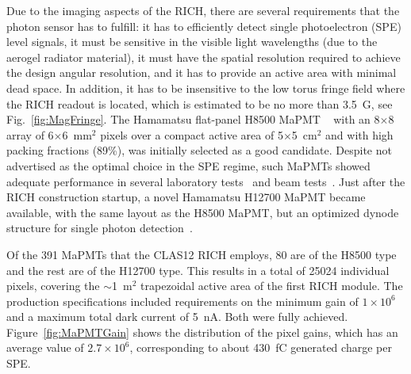 \documentclass[5p,times,twocolumn]{elsarticle}
\def\MaPMT{MaPMT }
\begin{document}
Due to the imaging aspects of the RICH, there are several requirements that the photon sensor has to fulfill: it has
to efficiently detect single photoelectron (SPE) level signals, it must be sensitive in the visible light wavelengths (due
to the aerogel radiator material), it must have the spatial resolution required to achieve the design angular resolution,
and it has to provide an active area with minimal dead space. In addition, it has to be insensitive to the low torus fringe
field where the RICH readout is located, which is estimated to be no more than 3.5~G, see Fig.~\ref{fig:MagFringe}.
The Hamamatsu flat-panel H8500 \MaPMT~\cite{Ref:H8500} with an 8$\times$8
array of 6$\times$6~mm$^2$ pixels over a compact active area of 5$\times$5~cm$^2$ and with high packing
fractions (89\%), was initially selected as a good candidate.
Despite not advertised as the optimal choice in the SPE regime, such MaPMTs showed adequate performance in several
laboratory tests~\cite{REF:MaPMT_test} and beam tests~\cite{REF:RICH_CERN}.
Just after the RICH construction startup, a novel Hamamatsu H12700 MaPMT became available, with the same layout as
the H8500 MaPMT, but an optimized dynode structure for single photon detection~\cite{Ref:H12700}.

Of the 391 MaPMTs that the CLAS12 RICH employs, 80 are of the H8500 type and the rest are of the H12700 type.
This results in a total of 25024 individual pixels, covering the $\sim$1~m$^2$ trapezoidal active area of the first
RICH module.
The production specifications included requirements on the minimum gain of $1 \times 10^6$ and a maximum total dark
current of 5~nA. Both were fully achieved. Figure~\ref{fig:MaPMTGain} shows the distribution of the pixel gains, which
has an average value of $2.7 \times 10^6$, corresponding to about 430~fC generated charge per SPE.
\end{document}
